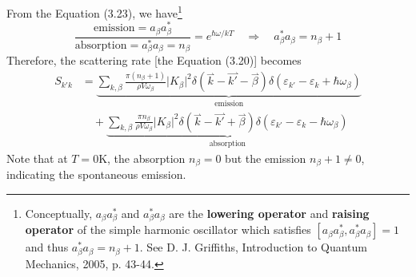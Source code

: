 \begin{equation}
\end{equation} From the Equation (3.23), we have\footnote{Conceptually, $a_{\beta}a_{\beta}^{*}$ and $a_{\beta}^{*}a_{\beta}$ are the {\bf lowering operator} and {\bf raising operator} of the simple harmonic oscillator which satisfies $[a_{\beta}a_{\beta}^{*},a_{\beta}^{*}a_{\beta}] = 1$ and thus $a_{\beta}^{*}a_{\beta}=n_{\beta}+1$. See D. J. Griffiths, Introduction to Quantum Mechanics, 2005, p. 43-44.} \begin{equation}
    \frac{\text{emission}=a_{\beta}a_{\beta}^{*}}{\text{absorption}=a_{\beta}^{*}a_{\beta}=n_{\beta}} = e^{\hbar\omega/kT}\quad\Rightarrow\quad a_{\beta}^{*}a_{\beta}=n_{\beta}+1
\end{equation} Therefore, the scattering rate [the Equation (3.20)] becomes \begin{align}
    S_{k'k}& = \underbrace{\sum_{k,\beta}{\frac{\pi(n_{\beta}+1)}{\rho V \omega_{\beta}}\big|K_{\beta}\big|^{2}\delta(\overset{\rightharpoonup}{k}-\overset{\rightharpoonup}{k'}-\overset{\rightharpoonup}{\beta})\delta(\varepsilon_{k'}-\varepsilon_{k}+\hbar\omega_{\beta})}}_{\text{emission}}\nonumber\\
    &\quad +\underbrace{\sum_{k,\beta}{\frac{\pi n_{\beta}}{\rho V \omega_{\beta}}\big|K_{\beta}\big|^{2}\delta(\overset{\rightharpoonup}{k}-\overset{\rightharpoonup}{k'}+\overset{\rightharpoonup}{\beta})\delta(\varepsilon_{k'}-\varepsilon_{k}-\hbar\omega_{\beta})}}_{\text{absorption}}
\end{align} Note that at $T=0$K, the absorption $n_{\beta} = 0$ but the emission $n_{\beta}+1\neq 0$, indicating the spontaneous emission.
